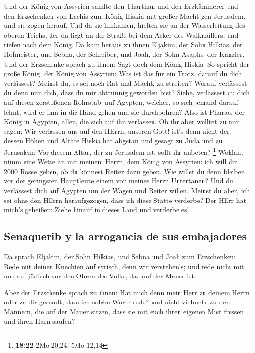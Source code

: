  Und der König von Assyrien sandte den Tharthan und den
Erzkämmerer und den Erzschenken von Lachis zum König Hiskia mit großer
Macht gen Jerusalem, und sie zogen herauf. Und da sie hinkamen, hielten
sie an der Wasserleitung des oberen Teichs, der da liegt an der Straße
bei dem Acker des Walkmüllers,  und riefen nach dem
König. Da kam heraus zu ihnen Eljakim, der Sohn Hilkias, der Hofmeister,
und Sebna, der Schreiber, und Joah, der Sohn Asaphs, der Kanzler.
 Und der Erzschenke sprach zu ihnen: Sagt doch dem König
Hiskia: So spricht der große König, der König von Assyrien: Was ist das
für ein Trotz, darauf du dich verlässest?  Meinst du, es
sei noch Rat und Macht, zu streiten? Worauf verlässest du denn nun dich,
dass du mir abtrünnig geworden bist?  Siehe, verlässest
du dich auf diesen zerstoßenen Rohrstab, auf Ägypten, welcher, so sich
jemand darauf lehnt, wird er ihm in die Hand gehen und sie durchbohren?
Also ist Pharao, der König in Ägypten, allen, die sich auf ihn
verlassen.  Ob ihr aber wolltet zu mir sagen: Wir
verlassen uns auf den HErrn, unseren Gott! ist's denn nicht der, dessen
Höhen und Altäre Hiskia hat abgetan und gesagt zu Juda und zu Jerusalem:
Vor diesem Altar, der zu Jerusalem ist, sollt ihr anbeten? \footnote{\textbf{18:22}
  2Mo 20,24; 5Mo 12,14}  Wohlan, nimm eine Wette an mit
meinem Herrn, dem König von Assyrien: ich will dir 2000 Rosse geben, ob
du könnest Reiter dazu geben.  Wie willst du denn bleiben
vor der geringsten Hauptleute einem von meines Herrn Untertanen? Und du
verlässest dich auf Ägypten um der Wagen und Reiter willen.
 Meinst du aber, ich sei ohne den HErrn heraufgezogen,
dass ich diese Stätte verderbe? Der HErr hat mich's geheißen: Ziehe
hinauf in dieses Land und verderbe es!

\hypertarget{senaquerib-y-la-arrogancia-de-sus-embajadores}{%
\subsection{Senaquerib y la arrogancia de sus
embajadores}\label{senaquerib-y-la-arrogancia-de-sus-embajadores}}

 Da sprach Eljakim, der Sohn Hilkias, und Sebna und Joah
zum Erzschenken: Rede mit deinen Knechten auf syrisch, denn wir
verstehen's; und rede nicht mit uns auf jüdisch vor den Ohren des Volks,
das auf der Mauer ist.

 Aber der Erzschenke sprach zu ihnen: Hat mich denn mein
Herr zu deinem Herrn oder zu dir gesandt, dass ich solche Worte rede?
und nicht vielmehr zu den Männern, die auf der Mauer sitzen, dass sie
mit euch ihren eigenen Mist fressen und ihren Harn saufen?

